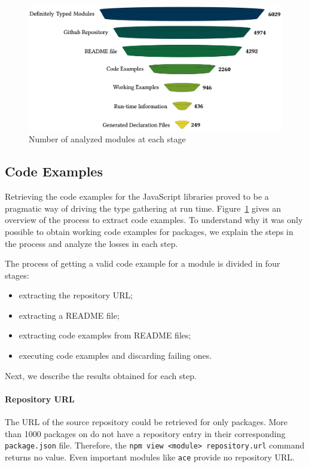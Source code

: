 \documentclass[sigplan,screen]{acmart}
\newcommand{\figref}[1]{Figure~\ref{#1}}
\begin{document}
\begin{figure}[tp]
  \centering
  \includegraphics[width=1\linewidth]{funnel.png}
  \caption[Number of analyzed modules for each stage of the experiment]{
    {Number of analyzed modules at each stage}
  } 
  \label{fig:experiments-overall-funnel}
\end{figure}

\subsection{Code Examples}
Retrieving the code examples for the JavaScript libraries proved to be
a pragmatic way of driving the type gathering at run time.
\figref{fig:experiments-overall-funnel} gives an overview of the
process to extract code examples. To understand why it was only possible
to obtain working code examples for \CountModulesWithCodeExamples{}
packages, we explain the steps in the process and analyze the losses
in each step.

The process of getting a valid code example for a module is divided in four
stages: 
\begin{itemize}
\item extracting the repository URL;
\item extracting a README file;
\item extracting code examples from README files;
\item executing code examples and discarding failing ones.
\end{itemize}

Next, we describe the results obtained for each step. 

\paragraph*{Repository URL}
The URL of the source repository could be retrieved for only \CountModulesWithRepositoryUrl{}
packages. More than 1000 packages on \NPM{} do not have a repository
entry in their corresponding \texttt{package.json} file. Therefore, the
\texttt{npm view <module> repository.url} command returns no
value. Even important modules like \texttt{ace} provide no repository URL.
\end{document}
